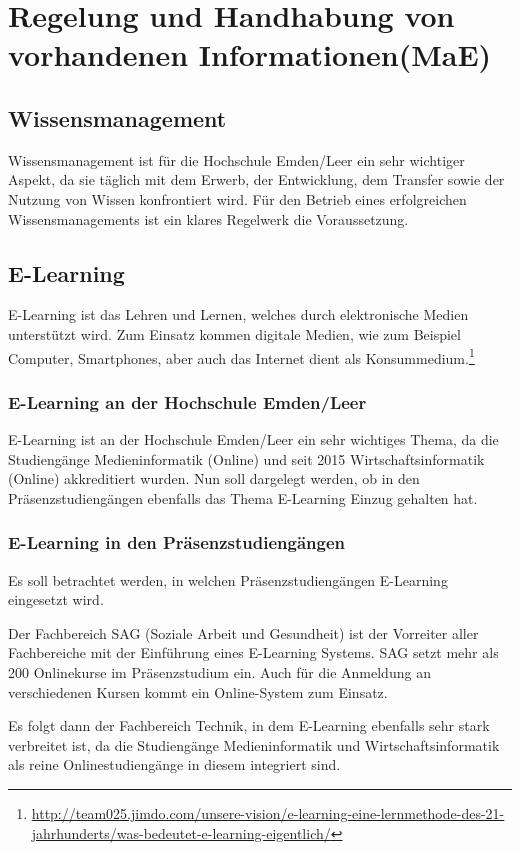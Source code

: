 \section{Regelung und Handhabung von vorhandenen Informationen(MaE)}

\subsection{Wissensmanagement}
Wissensmanagement ist für die Hochschule Emden/Leer ein sehr wichtiger Aspekt, da sie täglich mit dem Erwerb, der Entwicklung, dem Transfer sowie der Nutzung von Wissen konfrontiert wird. Für den Betrieb eines erfolgreichen Wissensmanagements ist ein klares Regelwerk die Voraussetzung.

\subsection{E-Learning}
E-Learning ist das Lehren und Lernen, welches durch elektronische Medien unterstützt wird. Zum Einsatz kommen digitale Medien, wie zum Beispiel Computer, Smartphones, aber auch das Internet dient als Konsummedium.\footnote{\url{http://team025.jimdo.com/unsere-vision/e-learning-eine-lernmethode-des-21-jahrhunderts/was-bedeutet-e-learning-eigentlich/}}

\subsubsection{E-Learning an der Hochschule Emden/Leer}
E-Learning ist an der Hochschule Emden/Leer ein sehr wichtiges Thema, da die Studiengänge Medieninformatik (Online) und seit 2015 Wirtschaftsinformatik (Online) akkreditiert  wurden. Nun soll dargelegt werden, ob in den Präsenzstudiengängen ebenfalls das Thema E-Learning Einzug gehalten hat.

\subsubsection{E-Learning in den Präsenzstudiengängen}
Es soll betrachtet werden, in welchen Präsenzstudiengängen E-Learning eingesetzt wird.

Der Fachbereich SAG (Soziale Arbeit und Gesundheit) ist der Vorreiter aller Fachbereiche mit der Einführung eines E-Learning Systems. SAG setzt mehr als 200 Onlinekurse im Präsenzstudium ein. Auch für die Anmeldung an verschiedenen Kursen kommt ein Online-System zum Einsatz.

Es folgt dann der Fachbereich Technik, in dem E-Learning ebenfalls sehr stark verbreitet ist, da die Studiengänge Medieninformatik und Wirtschaftsinformatik als reine Onlinestudiengänge in diesem integriert sind.

